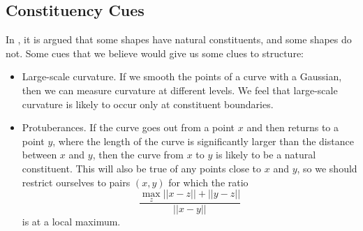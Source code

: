 

\subsection{Constituency Cues}
In \cite{basri-jacobs, hoffman-richards, Kimia2003Euler}, it is argued that some shapes have natural
constituents, and some shapes do not. Some cues that we believe would
give us some clues to structure: 
\begin{itemize}
\item Large-scale curvature. If we smooth the points of a curve with a
  Gaussian, then we can measure curvature at different levels. We feel
  that large-scale curvature is likely to occur only at constituent
  boundaries.
\item Protuberances. If the curve goes out from a point $x$ and then
  returns to a point $y$, where the length of the curve is
  significantly larger than the distance between $x$ and $y$, then the
  curve from $x$ to $y$ is likely to be a natural constituent. This
  will also be true of any points close to $x$ and $y$, so we should
  restrict ourselves to pairs $(x,y)$ for which the ratio 
$$\frac{\max_{z}||x-z|| + ||y-z||}{||x-y||}$$
is at a local maximum.
\end{itemize}

